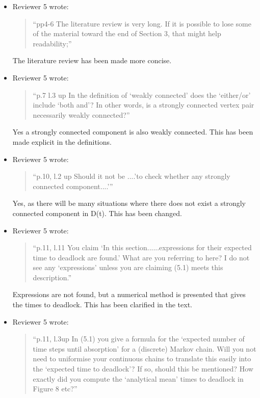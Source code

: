 \documentclass{article}
\begin{document}
\begin{itemize}
\item Reviewer 5 wrote:
\begin{quote}
``pp4-6 The literature review is very long. If it is possible to lose some of
the material toward the end of Section 3, that might help readability;''
\end{quote}

The literature review has been made more concise.


\item Reviewer 5 wrote:
\begin{quote}
``p.7 l.3 up In the definition of ‘weakly connected’ does the ‘either/or’
include ‘both and’? In other words, is a strongly connected vertex pair
necessarily weakly connected?''
\end{quote}

Yes a strongly connected component is also weakly connected. This has been made
explicit in the definitions.


\item Reviewer 5 wrote:
\begin{quote}
``p.10, l.2 up Should it not be ....’to check whether any strongly connected
component....’''
\end{quote}

Yes, as there will be many situations where there does not exist a strongly
connected component in D(t). This has been changed.


\item Reviewer 5 wrote:
\begin{quote}
``p.11, l.11 You claim ‘In this section......expressions for their expected time
to deadlock are found.’ What are you referring to here? I do not see any
‘expressions’ unless you are claiming (5.1) meets this description.''
\end{quote}

Expressions are not found, but a
numerical method is presented that gives the times to deadlock. This has been
clarified in the text.


\item Reviewer 5 wrote:
\begin{quote}
``p.11, l.3up In (5.1) you give a formula for the ‘expected number of time steps
until absorption’ for a (discrete) Markov chain. Will you not need to uniformise
your continuous chains to translate this easily into the ‘expected time to
deadlock’? If so, should this be mentioned? How exactly did you compute the
‘analytical mean’ times to deadlock in Figure 8 etc?''
\end{quote}


\end{itemize}
\end{document}
